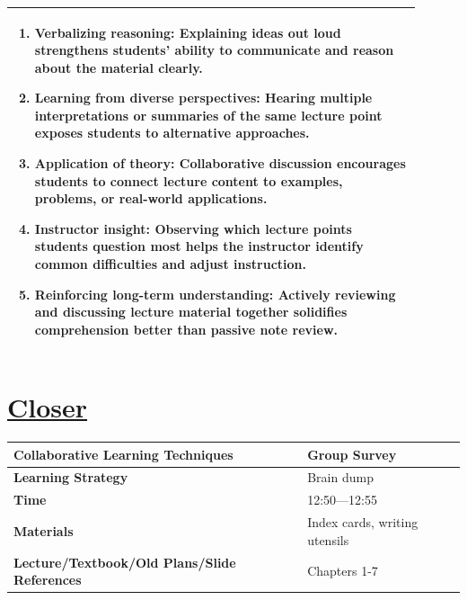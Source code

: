\documentclass{article}
\begin{document}
{{\begin{tabular}{|p{0.9\linewidth}|}
\begin{enumerate}
    \item \textbf{Verbalizing reasoning:} Explaining ideas out loud strengthens students’ ability to communicate and reason about the material clearly.
    \item \textbf{Learning from diverse perspectives:} Hearing multiple interpretations or summaries of the same lecture point exposes students to alternative approaches.
    \item \textbf{Application of theory:} Collaborative discussion encourages students to connect lecture content to examples, problems, or real-world applications.
    \item \textbf{Instructor insight:} Observing which lecture points students question most helps the instructor identify common difficulties and adjust instruction.
    \item \textbf{Reinforcing long-term understanding:} Actively reviewing and discussing lecture material together solidifies comprehension better than passive note review.
\end{enumerate} \\
\hline  
\end{tabular}

\newpage
\noindent
\section*{\underline{Closer}}
\begin{tabular}{|p{4.2cm}|p{9.8cm}|}
\hline
\textbf{Collaborative Learning Techniques} & Group Survey\\
\hline
\textbf{Learning Strategy} & Brain dump\\
\hline
\textbf{Time} & 12:50---12:55\\
\hline
\textbf{Materials} & Index cards, writing utensils\\
\hline
\textbf{Lecture/Textbook/Old Plans/Slide References} & Chapters 1-7 \\
\hline
\end{tabular}

}}
\end{document}
